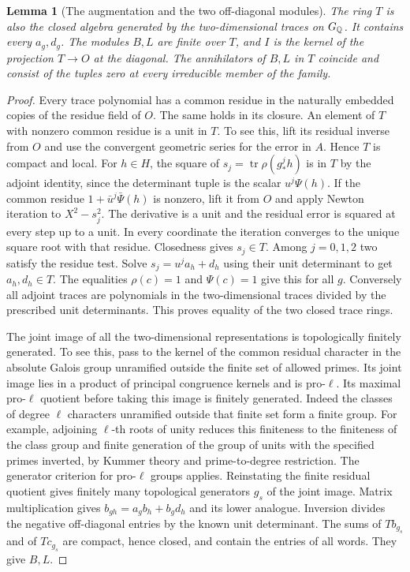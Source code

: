 \documentclass[a4paper,11pt]{article}
\newtheorem{lemma}[proposition]{Lemma}
\theoremstyle{definition}
\theoremstyle{remark}
\numberwithin{equation}{section}
\begin{document}
\begin{lemma}[The augmentation and the two off-diagonal modules]\leavevmode
\label{lem:spinalgebra307}
The ring \(T\) is also the closed algebra generated by the
two-dimensional traces on \(G_\mathbb Q\). It contains every
\(a_g,d_g\). The modules \(B,L\) are finite over \(T\), and
\(I\) is the kernel of the projection \(T\to O\) at the diagonal.
The annihilators of \(B,L\) in \(T\) coincide and consist of
the tuples zero at every irreducible member of the family.
\end{lemma}
\begin{proof}
Every trace polynomial has a common residue in the naturally
embedded copies of the residue field of \(O\). The same holds
in its closure. An element of \(T\) with nonzero common residue
is a unit in \(T\). To see this, lift its residual inverse from \(O\) and
use the convergent geometric series for the error in \(A\).
Hence \(T\) is compact and local. For \(h\in H\), the square
of \(s_j=\operatorname{tr}\rho(g_*^j h)\) is in \(T\) by the
adjoint identity, since the determinant tuple is the scalar
\(u^j\Psi(h)\). If the common residue
\(1+\bar u^j\bar\Psi(h)\) is nonzero, lift it from \(O\) and
apply Newton iteration to \(X^2-s_j^2\). The derivative is
a unit and the residual error is squared at every step
up to a unit. In every coordinate the iteration converges to
the unique square root with that residue. Closedness gives
\(s_j\in T\). Among \(j=0,1,2\) two satisfy the residue test.
Solve \(s_j=u^j a_h+d_h\) using their unit determinant to get
\(a_h,d_h\in T\). The equalities \(\rho(c)=1\) and
\(\Psi(c)=1\) give this for all \(g\). Conversely all adjoint
traces are polynomials in the two-dimensional traces divided
by the prescribed unit determinants. This proves equality of
the two closed trace rings.

The joint image of all the two-dimensional representations
is topologically finitely generated. To see this, pass to the
kernel of the common residual character in the absolute
Galois group unramified outside the finite set of allowed
primes. Its joint image lies in a product of principal
congruence kernels and is pro-\(\ell\). Its maximal pro-\(\ell\)
quotient before taking this image is finitely generated. Indeed the classes of degree \(\ell\) characters unramified outside
that finite set form a finite group. For example, adjoining
\(\ell\)-th roots of unity reduces this finiteness to the
finiteness of the class group and finite generation of
the group of units with the specified primes inverted, by
Kummer theory and prime-to-degree restriction. The generator
criterion for pro-\(\ell\) groups applies. Reinstating the
finite residual quotient gives finitely many topological
generators \(g_s\) of the joint image. Matrix multiplication
gives \(b_{gh}=a_g b_h+b_g d_h\) and its lower analogue.
Inversion divides the negative off-diagonal entries by the
known unit determinant. The sums of \(T b_{g_s}\) and of
\(T c_{g_s}\) are compact, hence closed, and contain the
entries of all words. They give \(B,L\).


\end{proof}
\end{document}
